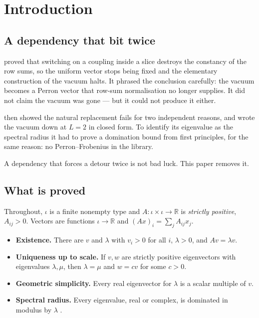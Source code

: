 \documentclass[11pt]{article}
\theoremstyle{definition}
\newcommand{\R}{\mathbb{R}}
\begin{document}
\section{Introduction}

\subsection{A dependency that bit twice}

\cite{ErikssonSpatial} proved that switching on a coupling inside a slice
destroys the constancy of the row sums, so the uniform vector stops being fixed
and the elementary construction of the vacuum halts.  It phrased the conclusion
carefully: the vacuum becomes a Perron vector that row-sum normalisation no
longer supplies.  It did not claim the vacuum was gone --- but it could not
produce it either.

\cite{ErikssonBirkhoff} then showed the natural replacement fails for two
independent reasons, and wrote the vacuum down at $L=2$ in closed form.  To
identify its eigenvalue as the spectral radius it had to prove a domination
bound from first principles, for the same reason: no Perron--Frobenius in the
library.

A dependency that forces a detour twice is not bad luck.  This paper removes it.

\subsection{What is proved}

Throughout, $\iota$ is a finite nonempty type and $A:\iota\times\iota\to\R$ is
\emph{strictly positive}, $A_{ij}>0$.  Vectors are functions $\iota\to\R$ and
$(Ax)_i=\sum_j A_{ij}x_j$.

\begin{itemize}
\item \textbf{Existence.}  There are $v$ and $\lambda$ with $v_i>0$ for all $i$,
      $\lambda>0$, and $Av=\lambda v$.
\item \textbf{Uniqueness up to scale.}  If $v,w$ are strictly positive
      eigenvectors with eigenvalues $\lambda,\mu$, then $\lambda=\mu$ and
      $w=cv$ for some $c>0$.
\item \textbf{Geometric simplicity.}  Every real eigenvector for $\lambda$ is a
      scalar multiple of $v$.
\item \textbf{Spectral radius.}  Every eigenvalue, real or complex, is dominated
      in modulus by $\lambda$ \cite{ErikssonBirkhoff}.
\end{itemize}
\end{document}
